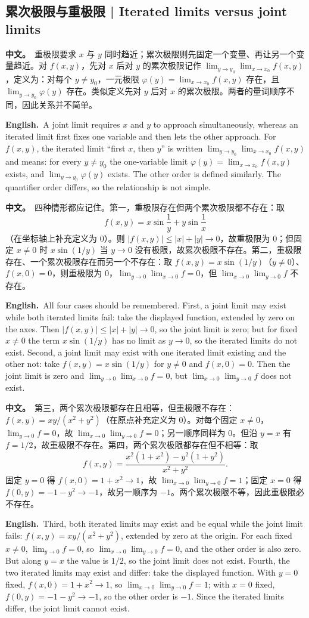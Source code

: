 \documentclass[UTF8,11pt,a4paper]{ctexart}
\newcommand{\BOTH}[2]{\par\noindent\textbf{中文。}\ #1\par\noindent\textbf{English.}\ #2\par}
\begin{document}
\subsection{累次极限与重极限 | Iterated limits versus joint limits}
\BOTH{重极限要求 $x$ 与 $y$ 同时趋近；累次极限则先固定一个变量、再让另一个变量趋近。对 $f(x,y)$，先对 $x$ 后对 $y$ 的累次极限记作 $\lim_{y\to y_0}\lim_{x\to x_0}f(x,y)$，定义为：对每个 $y\ne y_0$，一元极限 $\varphi(y)=\lim_{x\to x_0}f(x,y)$ 存在，且 $\lim_{y\to y_0}\varphi(y)$ 存在。类似定义先对 $y$ 后对 $x$ 的累次极限。两者的量词顺序不同，因此关系并不简单。}{A joint limit requires $x$ and $y$ to approach simultaneously, whereas an iterated limit first fixes one variable and then lets the other approach. For $f(x,y)$, the iterated limit “first $x$, then $y$” is written $\lim_{y\to y_0}\lim_{x\to x_0}f(x,y)$ and means: for every $y\ne y_0$ the one-variable limit $\varphi(y)=\lim_{x\to x_0}f(x,y)$ exists, and $\lim_{y\to y_0}\varphi(y)$ exists. The other order is defined similarly. The quantifier order differs, so the relationship is not simple.}
\BOTH{四种情形都应记住。第一，重极限存在但两个累次极限都不存在：取
\[
f(x,y)=x\sin\frac1y+y\sin\frac1x
\]
（在坐标轴上补充定义为 $0$）。则 $|f(x,y)|\le|x|+|y|\to0$，故重极限为 $0$；但固定 $x\ne0$ 时 $x\sin(1/y)$ 当 $y\to0$ 没有极限，故累次极限不存在。第二，重极限存在、一个累次极限存在而另一个不存在：取 $f(x,y)=x\sin(1/y)$（$y\ne0$）、$f(x,0)=0$，则重极限为 $0$，$\lim_{y\to0}\lim_{x\to0}f=0$，但 $\lim_{x\to0}\lim_{y\to0}f$ 不存在。}{All four cases should be remembered. First, a joint limit may exist while both iterated limits fail: take the displayed function, extended by zero on the axes. Then $|f(x,y)|\le|x|+|y|\to0$, so the joint limit is zero; but for fixed $x\ne0$ the term $x\sin(1/y)$ has no limit as $y\to0$, so the iterated limits do not exist. Second, a joint limit may exist with one iterated limit existing and the other not: take $f(x,y)=x\sin(1/y)$ for $y\ne0$ and $f(x,0)=0$. Then the joint limit is zero and $\lim_{y\to0}\lim_{x\to0}f=0$, but $\lim_{x\to0}\lim_{y\to0}f$ does not exist.}
\BOTH{第三，两个累次极限都存在且相等，但重极限不存在：$f(x,y)=xy/(x^2+y^2)$（在原点补充定义为 $0$）。对每个固定 $x\ne0$，$\lim_{y\to0}f=0$，故 $\lim_{x\to0}\lim_{y\to0}f=0$；另一顺序同样为 $0$。但沿 $y=x$ 有 $f=1/2$，故重极限不存在。第四，两个累次极限都存在但不相等：取
\[
f(x,y)=\frac{x^2(1+x^2)-y^2(1+y^2)}{x^2+y^2}.
\]
固定 $y=0$ 得 $f(x,0)=1+x^2\to1$，故 $\lim_{x\to0}\lim_{y\to0}f=1$；固定 $x=0$ 得 $f(0,y)=-1-y^2\to-1$，故另一顺序为 $-1$。两个累次极限不等，因此重极限必不存在。}{Third, both iterated limits may exist and be equal while the joint limit fails: $f(x,y)=xy/(x^2+y^2)$, extended by zero at the origin. For each fixed $x\ne0$, $\lim_{y\to0}f=0$, so $\lim_{x\to0}\lim_{y\to0}f=0$, and the other order is also zero. But along $y=x$ the value is $1/2$, so the joint limit does not exist. Fourth, the two iterated limits may exist and differ: take the displayed function. With $y=0$ fixed, $f(x,0)=1+x^2\to1$, so $\lim_{x\to0}\lim_{y\to0}f=1$; with $x=0$ fixed, $f(0,y)=-1-y^2\to-1$, so the other order is $-1$. Since the iterated limits differ, the joint limit cannot exist.}
\end{document}
